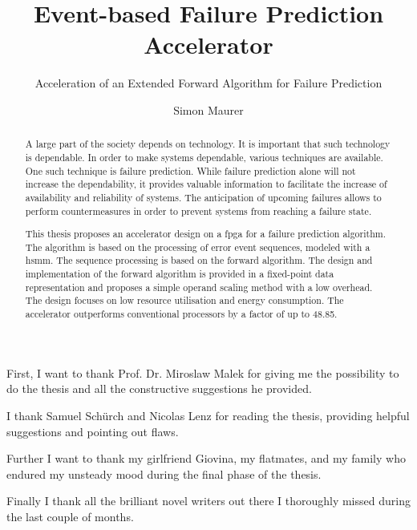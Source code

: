\documentclass[mscthesis]{usiinfthesis}
\title{Event-based Failure Prediction Accelerator} %
\subtitle{Acceleration of an Extended Forward Algorithm for Failure Prediction}
\author{Simon Maurer} %
\begin{document}
\maketitle %

\frontmatter %

\begin{abstract}
    A large part of the society depends on technology. It is important
    that such technology is dependable. In order to make systems dependable,
    various techniques are available. One such technique is failure prediction.
    While failure prediction alone will not increase the dependability, it
    provides valuable information to facilitate the increase of availability
    and reliability of systems. The anticipation of upcoming failures allows to
    perform countermeasures in order to prevent systems from reaching a failure
    state.

    This thesis proposes an accelerator design on a \acrfull{fpga} for
    a failure prediction algorithm. The algorithm is based on the processing of
    error event sequences, modeled with a \acrfull{hsmm}. The sequence
    processing is based on the forward algorithm. The design and implementation
    of the forward algorithm is provided in a fixed-point data representation
    and proposes a simple operand scaling method with a low overhead. The
    design focuses on low resource utilisation and energy consumption. The
    accelerator outperforms conventional processors by a factor of up to 48.85.
\end{abstract}

%

\begin{acknowledgements}
First, I want to thank Prof. Dr. Miroslaw Malek for giving me the possibility
to do the thesis and all the constructive suggestions he provided.

I thank Samuel Sch\"{u}rch and Nicolas Lenz for reading the thesis, providing
helpful suggestions and pointing out flaws.

Further I want to thank my girlfriend Giovina, my flatmates, and my family who
endured my unsteady mood during the final phase of the thesis.

Finally I thank all the brilliant novel writers out there I thoroughly missed
during the last couple of months.

\end{acknowledgements}
\end{document}
